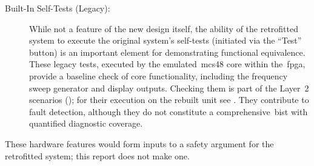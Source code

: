 \begin{description}
	\item[Built-In Self-Tests (Legacy):] While not a feature of the new design itself, the ability of the retrofitted system to execute the original system's self-tests (initiated via the \enquote{Test} button) is an important element for demonstrating functional equivalence. These legacy tests, executed by the emulated~\gls{mcs48} core within the~\gls{fpga}, provide a baseline check of core functionality, including the frequency sweep generator and display outputs. Checking them is part of the Layer~2 scenarios (); for their execution on the rebuilt unit see . They contribute to fault detection, although they do not constitute a comprehensive~\gls{bist} with quantified diagnostic coverage.
\end{description}
These hardware features would form inputs to a safety argument for the retrofitted system; this report does not make one.
